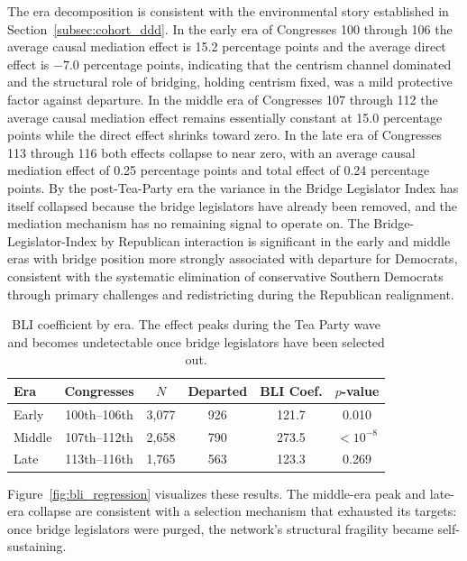 \documentclass[12pt, a4paper]{article}
\begin{document}
The era decomposition is consistent with the environmental story established in Section~\ref{subsec:cohort_ddd}. In the early era of Congresses 100 through 106 the average causal mediation effect is 15.2 percentage points and the average direct effect is $-7.0$ percentage points, indicating that the centrism channel dominated and the structural role of bridging, holding centrism fixed, was a mild protective factor against departure. In the middle era of Congresses 107 through 112 the average causal mediation effect remains essentially constant at 15.0 percentage points while the direct effect shrinks toward zero. In the late era of Congresses 113 through 116 both effects collapse to near zero, with an average causal mediation effect of 0.25 percentage points and total effect of 0.24 percentage points. By the post-Tea-Party era the variance in the Bridge Legislator Index has itself collapsed because the bridge legislators have already been removed, and the mediation mechanism has no remaining signal to operate on. The Bridge-Legislator-Index by Republican interaction is significant in the early and middle eras with bridge position more strongly associated with departure for Democrats, consistent with the systematic elimination of conservative Southern Democrats through primary challenges and redistricting during the Republican realignment.

\begin{table}[H]
\centering
\caption{BLI coefficient by era. The effect peaks during the Tea Party wave and becomes undetectable once bridge legislators have been selected out.}
\label{tab:bli_eras}
\begin{tabular}{lccccc}
\toprule
Era & Congresses & $N$ & Departed & BLI Coef. & $p$-value \\
\midrule
Early & 100th--106th & 3,077 & 926 & 121.7 & 0.010 \\
Middle & 107th--112th & 2,658 & 790 & 273.5 & $< 10^{-8}$ \\
Late & 113th--116th & 1,765 & 563 & 123.3 & 0.269 \\
\bottomrule
\end{tabular}
\end{table}

Figure~\ref{fig:bli_regression} visualizes these results. The middle-era peak and late-era collapse are consistent with a selection mechanism that exhausted its targets: once bridge legislators were purged, the network's structural fragility became self-sustaining.
\end{document}
